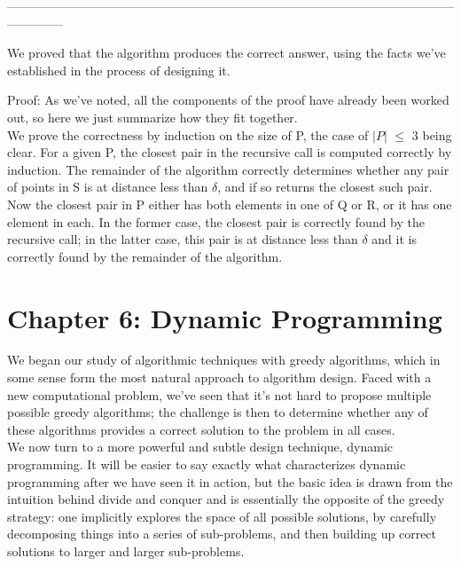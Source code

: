 \documentclass{article}
\begin{document}
--------------------------------------------------------------------------------------------------------------------------
\medskip

We proved that the algorithm produces the correct answer, using the facts we've established in the process of designing it.\\

\begin{center}
\end{center}

Proof: As we've noted, all the components of the proof have already been worked out, so here we just summarize how they fit together.\\
We prove the correctness by induction on the size of P, the case of $|P|$ $\le$ 3 being clear. For a given P, the closest pair in the recursive call is computed correctly by induction. The remainder of the algorithm correctly determines whether any pair of points in S is at distance less than $\delta$, and if so returns the closest such pair. Now the closest pair in P either has both elements in one of Q or R, or it has one element in each. In the former case, the closest pair is correctly found by the recursive call; in the latter case, this pair is at distance less than $\delta$ and it is correctly found by the remainder of the algorithm.\\

\begin{center}
\end{center}


\section{Chapter 6: Dynamic Programming}
 We began our study of algorithmic techniques with greedy algorithms, which in some sense form the most natural approach to algorithm design. Faced with a new computational problem, we’ve seen that it’s not hard to propose multiple possible greedy algorithms; the challenge is then to determine whether any of these algorithms provides a correct solution to the problem in all cases.\\
 
We now turn to a more powerful and subtle design technique, dynamic programming. It will be easier to say exactly what characterizes dynamic programming after we have seen it in action, but the basic idea is drawn from the intuition behind divide and conquer and is essentially the opposite of the greedy strategy: one implicitly explores the space of all possible solutions, by carefully decomposing things into a series of sub-problems, and then building up correct solutions to larger and larger sub-problems.
\end{document}
